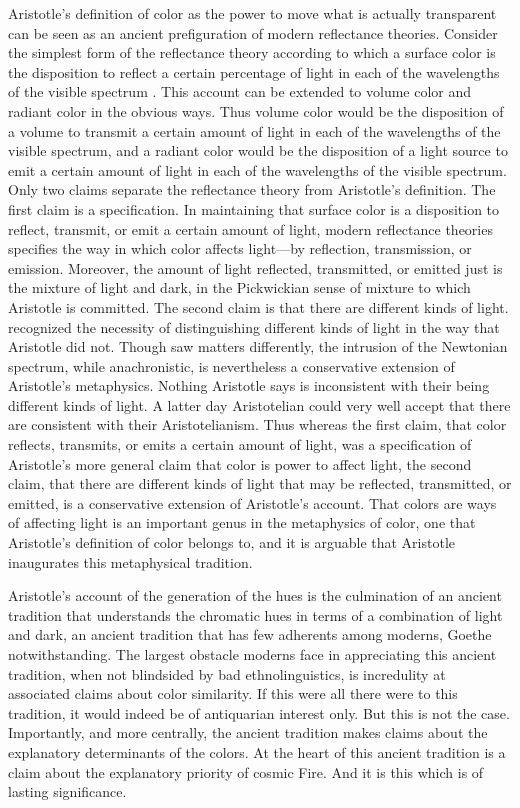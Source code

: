 Aristotle's definition of color as the power to move what is actually transparent can be seen as an ancient prefiguration of modern reflectance theories. Consider the simplest form of the reflectance theory according to which a surface color is the disposition to reflect a certain percentage of light in each of the wavelengths of the visible spectrum \citep[see][]{Hilbert:1987jq}. This account can be extended to volume color and radiant color in the obvious ways. Thus volume color would be the disposition of a volume to transmit a certain amount of light in each of the wavelengths of the visible spectrum, and a radiant color would be the disposition of a light source to emit a certain amount of light in each of the wavelengths of the visible spectrum. Only two claims separate the reflectance theory from Aristotle's definition. The first claim is a specification. In maintaining that surface color is a disposition to reflect, transmit, or emit a certain amount of light, modern reflectance theories specifies the way in which color affects light---by reflection, transmission, or emission. Moreover, the amount of light reflected, transmitted, or emitted just is the mixture of light and dark, in the Pickwickian sense of mixture to which Aristotle is committed. The second claim is that there are different kinds of light. \citet{Newton:1704qv} recognized the necessity of distinguishing different kinds of light in the way that Aristotle did not. Though \citet{Goethe:1810uq} saw matters differently, the intrusion of the Newtonian spectrum, while anachronistic, is nevertheless a conservative extension of Aristotle's metaphysics. Nothing Aristotle says is inconsistent with their being different kinds of light. A latter day Aristotelian could very well accept that there are consistent with their Aristotelianism. Thus whereas the first claim, that color reflects, transmits, or emits a certain amount of light, was a specification of Aristotle's more general claim that color is power to affect light, the second claim, that there are different kinds of light that may be reflected, transmitted, or emitted, is a conservative extension of Aristotle's account. That colors are ways of affecting light is an important genus in the metaphysics of color, one that Aristotle's definition of color belongs to, and it is arguable that Aristotle inaugurates this metaphysical tradition.

Aristotle's account of the generation of the hues is the culmination of an ancient tradition that understands the chromatic hues in terms of a combination of light and dark, an ancient tradition that has few adherents among moderns, Goethe notwithstanding. The largest obstacle moderns face in appreciating this ancient tradition, when not blindsided by bad ethnolinguistics, is incredulity at associated claims about color similarity. If this were all there were to this tradition, it would indeed be of antiquarian interest only. But this is not the case. Importantly, and more centrally, the ancient tradition makes claims about the explanatory determinants of the colors. At the heart of this ancient tradition is a claim about the explanatory priority of cosmic Fire. And it is this which is of lasting significance.


